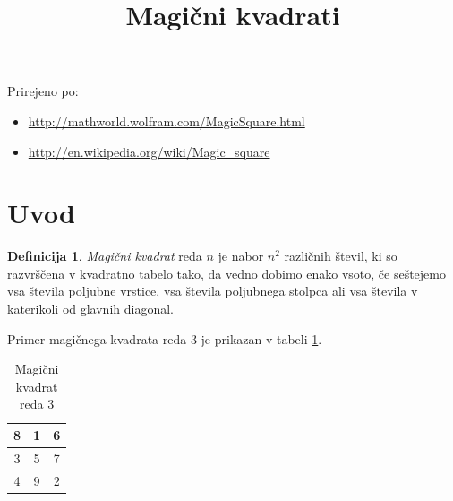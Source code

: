 \documentclass[a4paper,12pt]{article}
\title{Magični kvadrati}
\date{}
\author{}
\theoremstyle{definition}
\newtheorem{definicija}{Definicija}
\theoremstyle{plain}
\begin{document}
\maketitle

Prirejeno po:

\begin{itemize}
   \item  \url{http://mathworld.wolfram.com/MagicSquare.html}
   \item \url{http://en.wikipedia.org/wiki/Magic_square}
\end{itemize}


\tableofcontents



\newpage

\section{Uvod}

\begin{definicija}
   \emph{Magični kvadrat} reda \(n\) je nabor \(n^2\) različnih števil,
   ki so razvrščena v kvadratno tabelo tako, da vedno dobimo enako vsoto,
   če seštejemo vsa števila poljubne vrstice, vsa števila poljubnega
   stolpca ali vsa števila v katerikoli od glavnih diagonal.
\end{definicija}

Primer magičnega kvadrata reda 3 je prikazan v tabeli \ref{table:mag3}. %

\begin{table}[!ht]
   \centering
{\large
\begin{tabular}{|c|c|c|}
   \hline
   8 & 1 & 6 \\\hline
   3 & 5 & 7 \\\hline
   4 & 9 & 2 \\\hline
\end{tabular}
\normalsize
}
\caption{Magični kvadrat reda 3}
\label{table:mag3}
\end{table}
\end{document}
